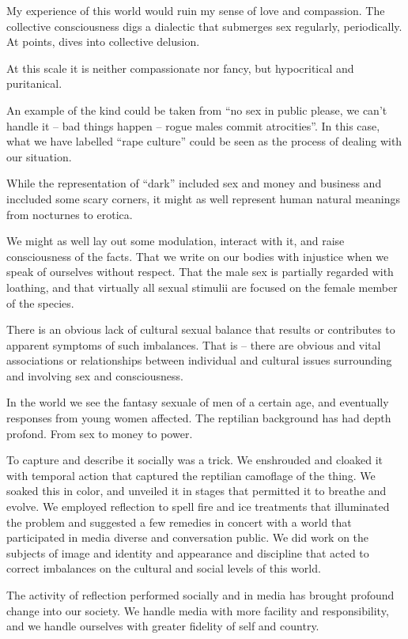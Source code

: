 

My experience of this world would ruin my sense of love and
compassion.  The collective consciousness digs a dialectic that
submerges sex regularly, periodically.  At points, dives into
collective delusion.  

At this scale it is neither compassionate nor fancy, but hypocritical
and puritanical.  

An example of the kind could be taken from ``no sex in public please,
we can't handle it -- bad things happen -- rogue males commit
atrocities''.  In this case, what we have labelled ``rape culture''
could be seen as the process of dealing with our situation.

While the representation of ``dark'' included sex and money and
business and inccluded some scary corners, it might as well represent
human natural meanings from nocturnes to erotica.  

We might as well lay out some modulation, interact with it, and raise
consciousness of the facts.  That we write on our bodies with
injustice when we speak of ourselves without respect.  That the male
sex is partially regarded with loathing, and that virtually all sexual
stimulii are focused on the female member of the species.

There is an obvious lack of cultural sexual balance that results or
contributes to apparent symptoms of such imbalances.  That is -- there
are obvious and vital associations or relationships between individual
and cultural issues surrounding and involving sex and consciousness.

In the world we see the fantasy sexuale of men of a certain age, and
eventually responses from young women affected.  The reptilian
background has had depth profond.  From sex to money to power.

To capture and describe it socially was a trick.  We enshrouded and
cloaked it with temporal action that captured the reptilian camoflage
of the thing.  We soaked this in color, and unveiled it in stages that
permitted it to breathe and evolve.  We employed reflection to spell
fire and ice treatments that illuminated the problem and suggested a
few remedies in concert with a world that participated in media
diverse and conversation public.  We did work on the subjects of image
and identity and appearance and discipline that acted to correct
imbalances on the cultural and social levels of this world.

The activity of reflection performed socially and in media has brought
profound change into our society.  We handle media with more facility
and responsibility, and we handle ourselves with greater fidelity of
self and country.

\bye
